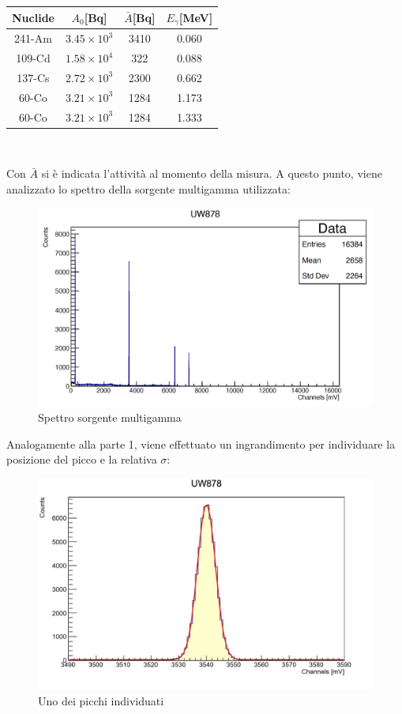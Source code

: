 \documentclass[a4paper,10pt]{article}
\begin{document}
\begin{center}
    \begin{tabular}{cccc}
        \toprule
        Nuclide & $A_{0}$[Bq] & $\bar{A}$[Bq] & $E_{\gamma}$[MeV]\\
        \midrule
         241-Am & $3.45 \times 10^3$ & 3410 & 0.060\\
	  109-Cd & $1.58 \times 10^4$ & 322 & 0.088\\
	  137-Cs & $2.72 \times 10^3$ & 2300 & 0.662\\
	  60-Co & $3.21 \times 10^3$ & 1284 & 1.173\\
	  60-Co & $3.21 \times 10^3$ & 1284 & 1.333\\
        \bottomrule
    \end{tabular}\\
\end{center}

\noindent Con $\bar{A}$ si \`e indicata l'attivit\`a al momento della misura.
\noindent A questo punto, viene analizzato lo spettro della sorgente multigamma utilizzata:

\begin{figure}[H]
    \centering
    \includegraphics[scale=0.45]{grafici/uw878}
    \caption{Spettro sorgente multigamma}
\end{figure}

\noindent Analogamente alla parte 1, viene effettuato un ingrandimento per individuare la posizione del picco e la relativa $\sigma$:

\begin{figure}[H]
    \centering
    \includegraphics[scale=0.6]{grafici/piccouw878}
    \caption{Uno dei picchi individuati}
\end{figure}
\end{document}
